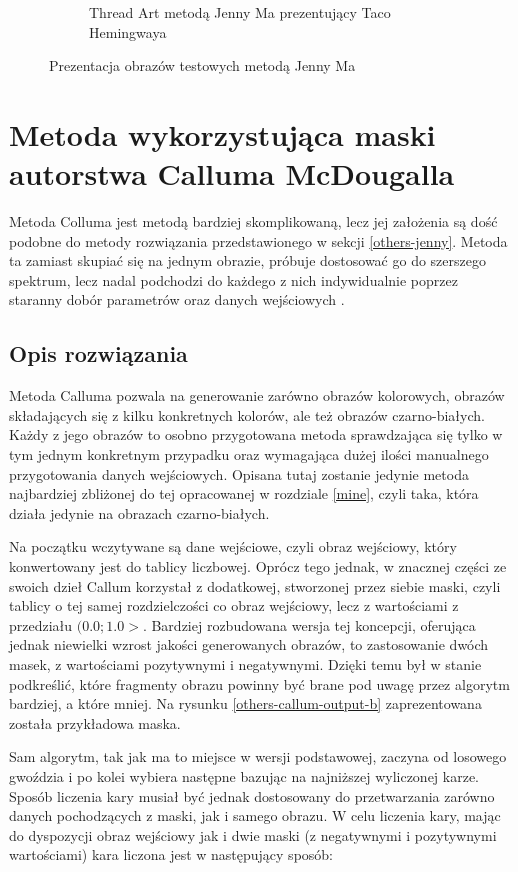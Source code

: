 \documentclass[a4paper, 12pt, polish, twoside]{extreport}
\begin{document}
\begin{figure}[H]
\begin{subfigure}{0.24\textwidth}
            \caption{Thread Art metodą Jenny Ma prezentujący Taco Hemingwaya}
            \label{others-jenny-output-d}
        \end{subfigure}
        \caption{Prezentacja obrazów testowych metodą Jenny Ma}
        \label{others-jenny-output}
        \end{figure}
            
    \section{Metoda wykorzystująca maski autorstwa Calluma McDougalla} \label{others-callum}
    Metoda Colluma jest metodą bardziej skomplikowaną, lecz jej założenia są dość podobne do metody rozwiązania przedstawionego w sekcji \ref{others-jenny}. Metoda ta zamiast skupiać się na jednym obrazie, próbuje dostosować go do szerszego spektrum, lecz nadal podchodzi do każdego z nich indywidualnie poprzez staranny dobór parametrów oraz danych wejściowych \cite{callum-github}.
        \subsection{Opis rozwiązania}
        Metoda Calluma pozwala na generowanie zarówno obrazów kolorowych, obrazów składających się z kilku konkretnych kolorów, ale też obrazów czarno-białych. Każdy z jego obrazów to osobno przygotowana metoda sprawdzająca się tylko w tym jednym konkretnym przypadku oraz wymagająca dużej ilości manualnego przygotowania danych wejściowych. Opisana tutaj zostanie jedynie metoda najbardziej zbliżonej do tej opracowanej w rozdziale \ref{mine}, czyli taka, która działa jedynie na obrazach czarno-białych.
        
        Na początku wczytywane są dane wejściowe, czyli obraz wejściowy, który konwertowany jest do tablicy liczbowej. Oprócz tego jednak, w znacznej części ze swoich dzieł Callum korzystał z dodatkowej, stworzonej przez siebie maski, czyli tablicy o tej samej rozdzielczości co obraz wejściowy, lecz z wartościami z przedziału \((0.0;1.0>\). Bardziej rozbudowana wersja tej koncepcji, oferująca jednak niewielki wzrost jakości generowanych obrazów, to zastosowanie dwóch masek, z wartościami pozytywnymi i negatywnymi. Dzięki temu był w stanie podkreślić, które fragmenty obrazu powinny być brane pod uwagę przez algorytm bardziej, a które mniej. Na rysunku \ref{others-callum-output-b} zaprezentowana została przykładowa maska.
        
        Sam algorytm, tak jak ma to miejsce w wersji podstawowej, zaczyna od losowego gwoździa i po kolei wybiera następne bazując na najniższej wyliczonej karze. Sposób liczenia kary musiał być jednak dostosowany do przetwarzania zarówno danych pochodzących z maski, jak i samego obrazu. W celu liczenia kary, mając do dyspozycji obraz wejściowy jak i dwie maski (z negatywnymi i pozytywnymi wartościami) kara liczona jest w następujący sposób:
        
\end{document}
